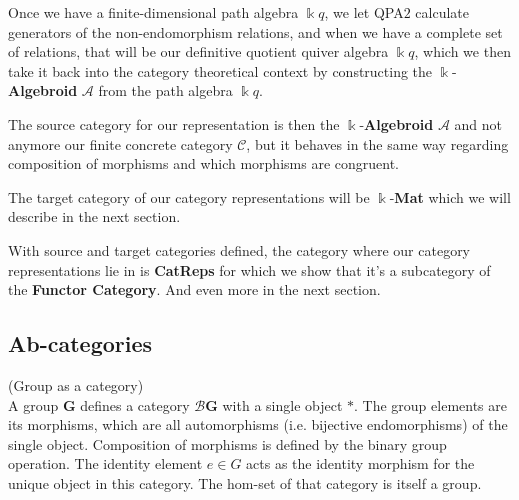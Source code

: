 Once we have a finite-dimensional path algebra $\Bbbk q$, we let \textsc{QPA$2$} calculate generators of the non-endomorphism relations,
and when we have a complete set of relations, that will be our definitive quotient quiver algebra $\Bbbk q$, which we then take it back into the category
theoretical context by constructing the $\Bbbk$-\textbf{Algebroid} $\mathcal{A}$ from the path algebra $\Bbbk q$.

The source category for our representation is then the $\Bbbk$-\textbf{Algebroid} $\mathcal{A}$ and not anymore our finite concrete
category $\mathcal{C}$, but it behaves in the same way regarding composition of morphisms and which morphisms are congruent.

The target category of our category representations will be $\Bbbk$-\textbf{Mat} which we will describe in the next section.

With source and target categories defined, the category where our category representations lie in is \textbf{CatReps} for which we
show that it's a subcategory of the \textbf{Functor Category}. And even more in the next section.

\subsection{Ab-categories}

\begin{example}{(Group as a category)}\\
\noindent A group $\mathbf{G}$ defines a category $\mathcal{B}\mathbf{G}$ with a single object $\ast$. The group elements are its morphisms, which are
all automorphisms (i.e. bijective endomorphisms) of the single object. Composition of morphisms is defined by the binary group operation.
The identity element $e \in G$ acts as the identity morphism for the unique object in this category. The hom-set of that category is itself
a group.
\end{example}

